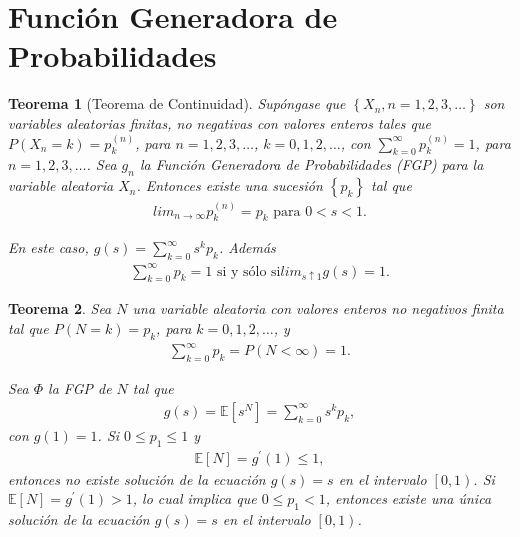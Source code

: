 \documentclass{article}
\newtheorem{Teo}{Teorema}[section]
\newcommand{\esp}{\mathbb{E}}
\numberwithin{equation}{section}
\begin{document}
 \section{Funci\'on Generadora de Probabilidades}

\begin{Teo}[Teorema de Continuidad]
Sup\'ongase que $\left\{X_{n},n=1,2,3,\ldots\right\}$ son variables aleatorias finitas, no negativas con valores enteros tales que $P\left(X_{n}=k\right)=p_{k}^{(n)}$, para $n=1,2,3,\ldots$, $k=0,1,2,\ldots$, con $\sum_{k=0}^{\infty}p_{k}^{(n)}=1$, para $n=1,2,3,\ldots$. Sea $g_{n}$ la Funci\'on Generadora de Probabilidades (FGP)  para la variable aleatoria $X_{n}$. Entonces existe una sucesi\'on $\left\{p_{k}\right\}$ tal que 
\begin{eqnarray}
lim_{n\rightarrow\infty}p_{k}^{(n)}=p_{k}\textrm{ para }0<s<1.
\end{eqnarray}

En este caso, $g\left(s\right)=\sum_{k=0}^{\infty}s^{k}p_{k}$. Adem\'as
\begin{eqnarray}
\sum_{k=0}^{\infty}p_{k}=1\textrm{ si y s\'olo si
}lim_{s\uparrow1}g\left(s\right)=1.
\end{eqnarray}
\end{Teo}

\begin{Teo}
Sea $N$ una variable aleatoria con valores enteros no negativos finita tal que $P\left(N=k\right)=p_{k}$, para $k=0,1,2,\ldots$, y 
\begin{eqnarray}
\sum_{k=0}^{\infty}p_{k}=P\left(N<\infty\right)=1.
\end{eqnarray} 

Sea $\Phi$ la FGP de $N$ tal que
\begin{eqnarray}
g\left(s\right)=\esp\left[s^{N}\right]=\sum_{k=0}^{\infty}s^{k}p_{k},
\end{eqnarray}
 con $g\left(1\right)=1$. Si $0\leq p_{1}\leq1$ y 
 \begin{eqnarray}
\esp\left[N\right]=g^{'}\left(1\right)\leq1,
\end{eqnarray}
 entonces no existe soluci\'on  de la ecuaci\'on $g\left(s\right)=s$ en el intervalo $\left[0,1\right)$. Si $\esp\left[N\right]=g^{'}\left(1\right)>1$, lo cual implica que $0\leq p_{1}<1$, entonces existe una \'unica soluci\'on de la ecuaci\'on $g\left(s\right)=s$ en el intervalo $\left[0,1\right)$.
\end{Teo}
\end{document}
